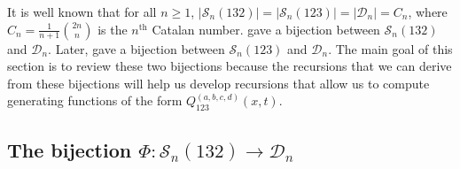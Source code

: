 \documentclass[
final,nomarks
]{dmtcs-episciences}
\newcommand{\Sn}[1]{\mathcal{S}_{#1}}
\begin{document}
It is well known that for all \begin{math}n \geq 1\end{math}, 
\begin{math}|\Sn{n}(132)|=|\Sn{n}(123)|=|\mathcal{D}_n|=C_n\end{math}, where \begin{math}C_n = \frac{1}{n+1}\binom{2n}{n}\end{math} is the 
\begin{math}n^{\mathrm{th}}\end{math} Catalan number. \cite{Kr} gave a bijection between \begin{math}\Sn{n}(132)\end{math} and \begin{math}\mathcal{D}_n\end{math}. Later, \cite{EliDeu} gave a bijection between \begin{math}\Sn{n}(123)\end{math} and \begin{math}\mathcal{D}_n\end{math}. The main goal of this section is to
review these two bijections because the recursions that we can derive from 
these bijections will help us develop recursions that allow us to compute 
generating functions of the form \begin{math}Q_{123}^{(a,b,c,d)}(x,t)\end{math}. 

\subsection{The bijection \(\Phi:\Sn{n}(132) \rightarrow \mathcal{D}_n\)}
\end{document}
